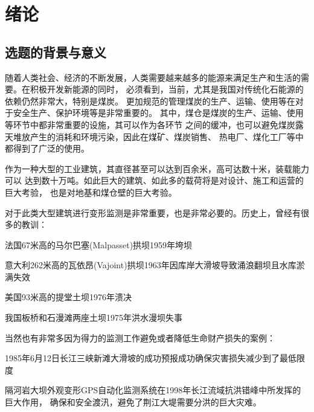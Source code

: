 
\chapter{绪论}
\label{chap00}

\section{选题的背景与意义}
随着人类社会、经济的不断发展，人类需要越来越多的能源来满足生产和生活的需要。在积极开发新能源的同时，
必须看到，当前，尤其是我国对传统化石能源的依赖仍然非常大，特别是煤炭。
更加规范的管理煤炭的生产、运输、使用等在对于安全生产、保护环境等是非常重要的。
其中，煤仓是煤炭的生产、运输、使用等环节中都非常重要的设施，其可以作为各环节
之间的缓冲，也可以避免煤炭露天堆放产生的消耗和环境污染，因此在煤矿、煤炭销售、
热电厂、煤化工厂等中都得到了广泛的使用。

作为一种大型的工业建筑，其直径甚至可以达到百余米，高可达数十米，装载能力可以
达到数十万吨。如此巨大的建筑、如此多的载荷将是对设计、施工和运营的巨大考验，
也是对地基和煤仓壁的巨大考验。

对于此类大型建筑进行变形监测是非常重要，也是非常必要的。历史上，曾经有很多的教训：
\begin{asparaitem}[$\bullet$]
\item 法国67米高的马尔巴塞(Malpasset)拱坝1959年垮坝
\item 意大利262米高的瓦依昂(Vajoint)拱坝1963年因库岸大滑坡导致涌浪翻坝且水库淤满失效
\item 美国93米高的提堂土坝1976年溃决
\item 我国板桥和石漫滩两座土坝1975年洪水漫坝失事
\end{asparaitem}
当然也有非常多因为得力的监测工作避免或者降低生命财产损失的案例：
\begin{asparaitem}[$\bullet$]
\item 1985年6月12日长江三峡新滩大滑坡的成功预报成功确保灾害损失减少到了最低限度
\item 隔河岩大坝外观变形GPS自动化监测系统在1998年长江流域抗洪错峰中所发挥的巨大作用，
确保和安全渡汛，避免了荆江大堤需要分洪的巨大灾难。
\end{asparaitem}

